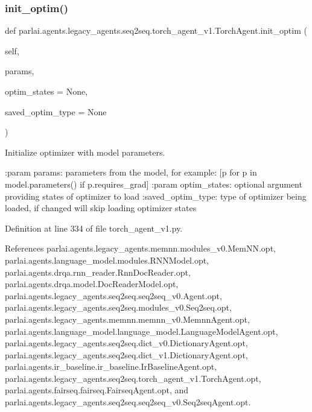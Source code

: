 \subsubsection{\texorpdfstring{init\+\_\+optim()}{init\_optim()}}
{\footnotesize\ttfamily def parlai.\+agents.\+legacy\+\_\+agents.\+seq2seq.\+torch\+\_\+agent\+\_\+v1.\+Torch\+Agent.\+init\+\_\+optim (\begin{DoxyParamCaption}\item[{}]{self,  }\item[{}]{params,  }\item[{}]{optim\+\_\+states = {\ttfamily None},  }\item[{}]{saved\+\_\+optim\+\_\+type = {\ttfamily None} }\end{DoxyParamCaption})}

\begin{DoxyVerb}Initialize optimizer with model parameters.

:param params:       parameters from the model, for example:
             [p for p in model.parameters() if p.requires_grad]
:param optim_states: optional argument providing states of optimizer
             to load
:saved_optim_type:   type of optimizer being loaded, if changed will
             skip loading optimizer states
\end{DoxyVerb}
 

Definition at line 334 of file torch\+\_\+agent\+\_\+v1.\+py.



References parlai.\+agents.\+legacy\+\_\+agents.\+memnn.\+modules\+\_\+v0.\+Mem\+N\+N.\+opt, parlai.\+agents.\+language\+\_\+model.\+modules.\+R\+N\+N\+Model.\+opt, parlai.\+agents.\+drqa.\+rnn\+\_\+reader.\+Rnn\+Doc\+Reader.\+opt, parlai.\+agents.\+drqa.\+model.\+Doc\+Reader\+Model.\+opt, parlai.\+agents.\+legacy\+\_\+agents.\+seq2seq.\+seq2seq\+\_\+v0.\+Agent.\+opt, parlai.\+agents.\+legacy\+\_\+agents.\+seq2seq.\+modules\+\_\+v0.\+Seq2seq.\+opt, parlai.\+agents.\+legacy\+\_\+agents.\+memnn.\+memnn\+\_\+v0.\+Memnn\+Agent.\+opt, parlai.\+agents.\+language\+\_\+model.\+language\+\_\+model.\+Language\+Model\+Agent.\+opt, parlai.\+agents.\+legacy\+\_\+agents.\+seq2seq.\+dict\+\_\+v0.\+Dictionary\+Agent.\+opt, parlai.\+agents.\+legacy\+\_\+agents.\+seq2seq.\+dict\+\_\+v1.\+Dictionary\+Agent.\+opt, parlai.\+agents.\+ir\+\_\+baseline.\+ir\+\_\+baseline.\+Ir\+Baseline\+Agent.\+opt, parlai.\+agents.\+legacy\+\_\+agents.\+seq2seq.\+torch\+\_\+agent\+\_\+v1.\+Torch\+Agent.\+opt, parlai.\+agents.\+fairseq.\+fairseq.\+Fairseq\+Agent.\+opt, and parlai.\+agents.\+legacy\+\_\+agents.\+seq2seq.\+seq2seq\+\_\+v0.\+Seq2seq\+Agent.\+opt.


